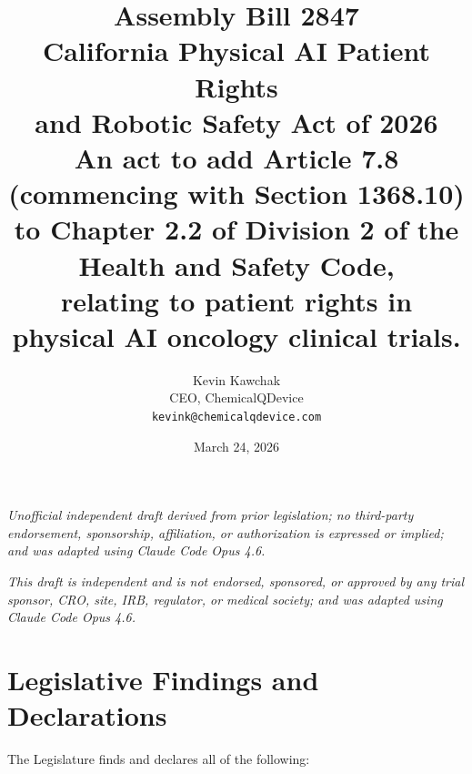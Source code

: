 \documentclass[11pt,letterpaper]{article}
\title{%
  \textbf{Assembly Bill 2847}\\[6pt]
  \large California Physical AI Patient Rights\\
  and Robotic Safety Act of 2026\\[6pt]
  \normalsize An act to add Article 7.8 (commencing with Section 1368.10)\\
  to Chapter 2.2 of Division 2 of the Health and Safety Code,\\
  relating to patient rights in physical AI oncology clinical trials.
}
\author{%
  Kevin Kawchak\\
  CEO, ChemicalQDevice\\
  \texttt{kevink@chemicalqdevice.com}
}
\date{March 24, 2026}
\begin{document}
\maketitle
\thispagestyle{fancy}

\begin{center}
\footnotesize
\textit{Unofficial independent draft derived from prior legislation;
no third-party endorsement, sponsorship, affiliation, or authorization
is expressed or implied; and was adapted using Claude Code Opus 4.6.}
\end{center}

\vspace{0.5em}

\begin{center}
\footnotesize
\textit{This draft is independent and is not endorsed, sponsored, or approved
by any trial sponsor, CRO, site, IRB, regulator, or medical society;
and was adapted using Claude Code Opus 4.6.}
\end{center}

\vspace{1em}
\tableofcontents
\newpage

\section{Legislative Findings and Declarations}

The Legislature finds and declares all of the following:
\end{document}
